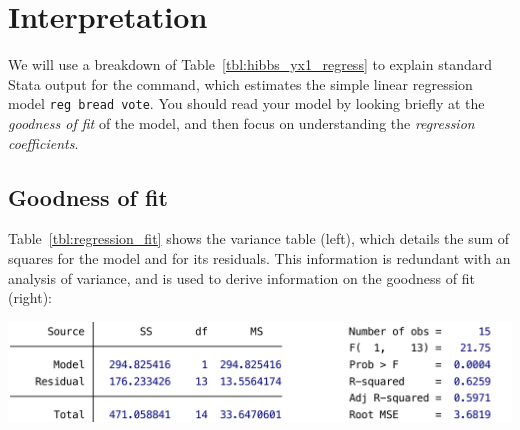 %
%
%
\section{Interpretation}%
  \label{sec:linreg}

We will use a breakdown of Table~\ref{tbl:hibbs_yx1_regress} to explain standard Stata output for the  command, which estimates the simple linear regression model \texttt{reg bread vote}. You should read your model by looking briefly at the \emph{goodness of fit} of the model, and then focus on understanding the \emph{regression coefficients}.

% 	
% 

	\subsection{Goodness of fit}%
    \label{sec:goodness}%
	Table~\ref{tbl:regression_fit} shows the variance table (left), which details the sum of squares for the model and for its residuals. This information is redundant with an analysis of variance, and is used to derive information on the goodness of fit (right):

	\begin{table}[htp]
		\includegraphics[scale=.5]{images/hibbs_yx1_regress_top.pdf}

	  	\caption[Extract from  output (1): Variance and goodness of fit]{\label{tbl:regression_fit}%
		Extract from  output (1): %
    Variance and goodness of fit. %
		\hibbs}
	\end{table}%

